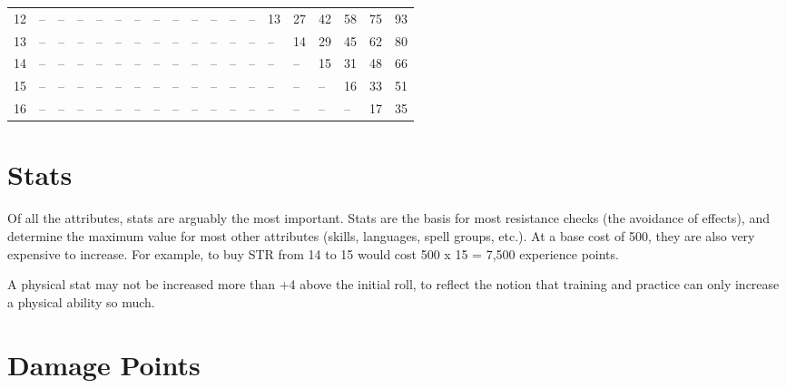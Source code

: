 \begin{center}
\begin{normbox}
\begin{tabular}{@{}l l l l l l l l l l l l l l l l l l l}
12 & -- & -- & -- & -- & -- & -- & -- & -- & -- & -- & -- & -- & 13 & 27 & 42 & 58 & 75 & 93\\
13 & -- & -- & -- & -- & -- & -- & -- & -- & -- & -- & -- & -- & -- & 14 & 29 & 45 & 62 & 80\\
14 & -- & -- & -- & -- & -- & -- & -- & -- & -- & -- & -- & -- & -- & -- & 15 & 31 & 48 & 66\\
15 & -- & -- & -- & -- & -- & -- & -- & -- & -- & -- & -- & -- & -- & -- & -- & 16 & 33 & 51\\
16 & -- & -- & -- & -- & -- & -- & -- & -- & -- & -- & -- & -- & -- & -- & -- & -- & 17 & 35\\
\end{tabular}
\end{normbox}
\end{center}
\vspace{10pt}
\section{Stats}

Of all the attributes, stats are arguably the most important. Stats are the basis for most resistance checks (the avoidance of effects), and determine the maximum value for most other attributes (skills, languages, spell groups, etc.). At a base cost of 500, they are also very expensive to increase. For example, to buy STR from 14 to 15 would cost 500 x 15 = 7,500 experience points.

A physical stat may not be increased more than +4 above the initial roll, to reflect the notion that training and practice can only increase a physical ability so much.
\section{Damage Points}

